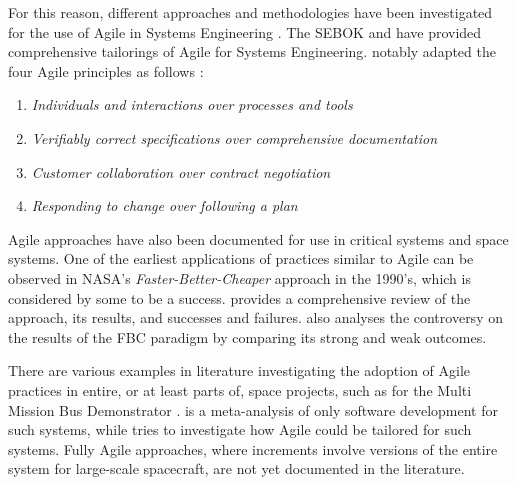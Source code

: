 \documentclass[a4paper,nobib,justified,final]{tufte-book}
\begin{document}
For this reason, different approaches and methodologies have been investigated for the use of Agile in Systems Engineering \autocite{carsonCanSystemsEngineering2013,AgileComplexSystems,mcdanielGoodBadAgile2003,darrinAgileManifestoDesign2017,bottAnalysisTheoriesSupporting2019,petersonWhenWorldsCollide2021}.
The \acf{SEBOK} \autocite{sebok_agile} and \citeauthor{douglassAgileSystemsEngineering2015} \autocite{douglassAgileSystemsEngineering2015} have provided comprehensive tailorings of Agile for Systems Engineering. \citeauthor{douglassAgileSystemsEngineering2015} notably adapted the four Agile principles as follows \autocite{douglassAgileSystemsEngineering2015}:
\begin{enumerate}[itemsep=-2ex]
	\item \emph{Individuals and interactions over processes and tools}
	\item \emph{Verifiably correct specifications over comprehensive documentation}
	\item \emph{Customer collaboration over contract negotiation}
	\item \emph{Responding to change over following a plan}
\end{enumerate}

Agile approaches have also been documented for use in critical systems and space systems. One of the earliest applications of practices similar to Agile can be observed in NASA's \emph{Faster-Better-Cheaper} approach in the 1990's, which is considered by some to be a success. \autocite{dimarioSystemicsNASAFasterBetterCheaper2005} provides a comprehensive review of the approach, its results, and successes and failures. \autocite{dillonFasterBetterCheaperProjectsToo2015} also analyses the controversy on the results of the FBC paradigm by comparing its strong and weak outcomes.

There are various examples in literature investigating the adoption of Agile practices in entire, or at least parts of, space projects, such as for the Multi Mission Bus Demonstrator \autocite{huangAgileHardwareSoftware2012}. %
 \autocite{kasauliSafetyCriticalSystemsAgile2018} is a meta-analysis of only software development for such systems, while \autocite{carpenterAgileTooFragile2014} tries to investigate how Agile could be tailored for such systems. Fully Agile approaches, where increments involve versions of the entire system for large-scale spacecraft, are not yet documented in the literature.
 
\end{document}
